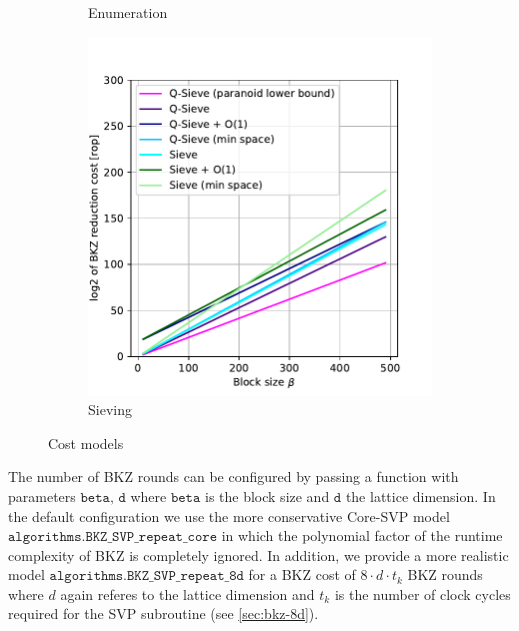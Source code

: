\begin{figure}[h!]
\begin{subfigure}{0.5\textwidth}
        \caption{Enumeration}\label{fig:costmodels-enum}
    \end{subfigure}
    \begin{subfigure}{0.49\textwidth}
        \centering
        \includegraphics[width=1\textwidth]{graphics/cost_models_sieving.pdf}
        \caption{Sieving}\label{fig:costmodels-sieving}
    \end{subfigure}
    \caption{Cost models}\label{fig:costmodels}
\end{figure}
The number of BKZ rounds can be configured by passing a function with parameters $\texttt{beta, d}$ where $\texttt{beta}$ is the block size and $\texttt{d}$ the lattice dimension. In the default configuration we use the more conservative Core-SVP model $\texttt{algorithms.BKZ\_SVP\_repeat\_core}$ \cite{ADPS16} in which the polynomial factor of the runtime complexity of BKZ is completely ignored. In addition, we provide a more realistic model $\texttt{algorithms.BKZ\_SVP\_repeat\_8d}$ for a BKZ cost of $8 \cdot d \cdot t_k$ BKZ rounds where $d$ again referes to the lattice dimension and $t_k$ is the number of clock cycles required for the SVP subroutine (see \cref{sec:bkz-8d}). %


